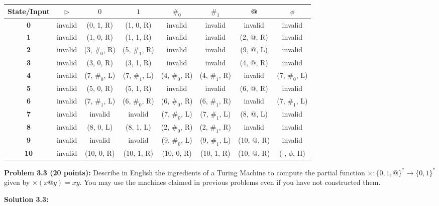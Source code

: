 \documentclass[11pt]{article}
\begin{document}
\begin{center}
\begin{tabular}{ | c | c | c | c | c | c | c | c |}
	\hline
	\textbf{State/Input} & $\triangleright$ & $0$ & $1$ & $\#_0$ & $\#_1$ & @ & $\phi$ \\
	\hline\hline
	\textbf{0} & invalid & (0, 1, R) & (1, 0, R) & invalid & invalid & invalid & invalid\\
	\hline
	\textbf{1} & invalid & (1, 0, R) & (1, 1, R) & invalid & invalid & (2, @, R) & invalid\\
	\hline
	\textbf{2} & invalid & (3, $\#_0$, R) & (5, $\#_1$, R) & invalid & invalid & (9, @, L) & invalid \\
	\hline
	\textbf{3} & invalid & (3, 0, R) & (3, 1, R) & invalid & invalid & (4, @, R) & invalid\\
	\hline
	\textbf{4} & invalid & (7, $\#_0$, L) & (7, $\#_1$, L) & (4, $\#_0$, R) & (4, $\#_1$, R) & invalid & (7, $\#_0$, L) \\
	\hline
	\textbf{5} & invalid & (5, 0, R) & (5, 1, R) & invalid & invalid & (6, @, R) & invalid \\
	\hline
	\textbf{6} & invalid & (7, $\#_1$, L) & (6, $\#_0$, R) & (6, $\#_0$, R) & (6, $\#_1$, R) & invalid & (7, $\#_1$, L)\\
	\hline
	\textbf{7} & invalid & invalid & invalid & (7, $\#_0$, L) & (7, $\#_1$, L) & (8, @, L) & invalid \\
	\hline
	\textbf{8} & invalid & (8, 0, L) & (8, 1, L) & (2, $\#_0$, R) & (2, $\#_1$, R) & invalid & invalid \\
	\hline
	\textbf{9} & invalid & invalid & invalid & (9, $\#_0$, L) & (9, $\#_1$, L) & (10, @, R) & invalid \\
	\hline
	\textbf{10} & invalid & (10, 0, R) & (10, 1, R) & (10, 0, R) & (10, 1, R) & (10, @, R) & (-, $\phi$, H)\\
	\hline
\end{tabular}
\end{center}

\newpage

\textbf{Problem 3.3 (20 points):} Describe in English the ingredients of a Turing Machine to compute the partial function $\times:\{0,1,@\}^* \to  \{0,1\}^*$ given by $\times(x @ y) = xy$. You may use the machines claimed in previous problems even if you have not constructed them. 

\textbf{Solution 3.3:} 
\end{document}

